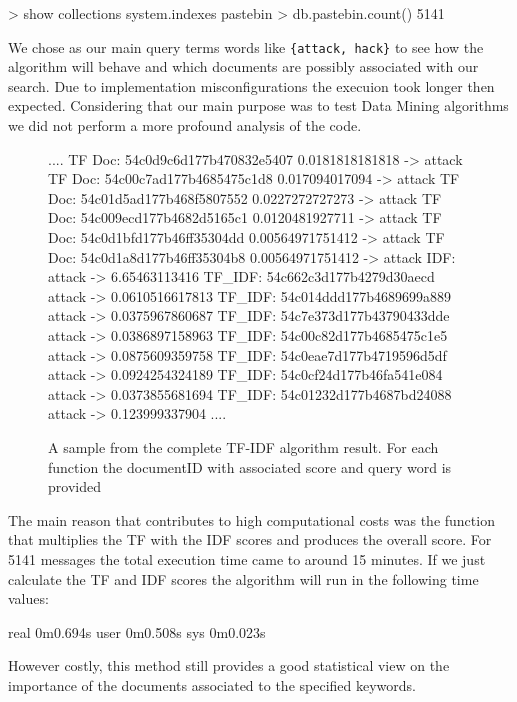 \documentclass[12pt]{article}
\begin{document}
\begin{spverbatim}
> show collections
system.indexes
pastebin
> db.pastebin.count()
5141
\end{spverbatim}
\hfill \break 
We chose as our main query terms words like \texttt{\{attack, hack\}} to see how the algorithm will behave and which documents are possibly associated with our search. Due to implementation misconfigurations the execuion took longer then expected. Considering that our main purpose was to test Data Mining algorithms we did not perform a more profound analysis of the code.
\begin{figure}[h!] 
\begin{footnotesize} 
\begin{spverbatim}
....
TF Doc: 54c0d9c6d177b470832e5407 0.0181818181818 -> attack
TF Doc: 54c00c7ad177b4685475c1d8 0.017094017094 -> attack
TF Doc: 54c01d5ad177b468f5807552 0.0227272727273 -> attack
TF Doc: 54c009ecd177b4682d5165c1 0.0120481927711 -> attack
TF Doc: 54c0d1bfd177b46ff35304dd 0.00564971751412 -> attack
TF Doc: 54c0d1a8d177b46ff35304b8 0.00564971751412 -> attack
IDF:  attack -> 6.65463113416
TF_IDF:  54c662c3d177b4279d30aecd attack -> 0.0610516617813
TF_IDF:  54c014ddd177b4689699a889 attack -> 0.0375967860687
TF_IDF:  54c7e373d177b43790433dde attack -> 0.0386897158963
TF_IDF:  54c00c82d177b4685475c1e5 attack -> 0.0875609359758
TF_IDF:  54c0eae7d177b4719596d5df attack -> 0.0924254324189
TF_IDF:  54c0cf24d177b46fa541e084 attack -> 0.0373855681694
TF_IDF:  54c01232d177b4687bd24088 attack -> 0.123999337904
....
\end{spverbatim}
\captionsetup{font=small}
\caption{A sample from the complete TF-IDF algorithm result. For each function the documentID with associated score and query word is provided}
\end{footnotesize}
\end{figure}
The main reason that contributes to high computational costs was the function that multiplies the TF with the IDF scores and produces the overall score. For 5141 messages the total execution time came to around 15 minutes. If we just calculate the TF and IDF scores the algorithm will run in the following time values:
\begin{spverbatim}
real	0m0.694s
user	0m0.508s
sys	0m0.023s
\end{spverbatim}
\hfill \break 
However costly, this method still provides a good statistical view on the importance of the documents associated to the specified keywords. 
\hfill \break 
\end{document}
